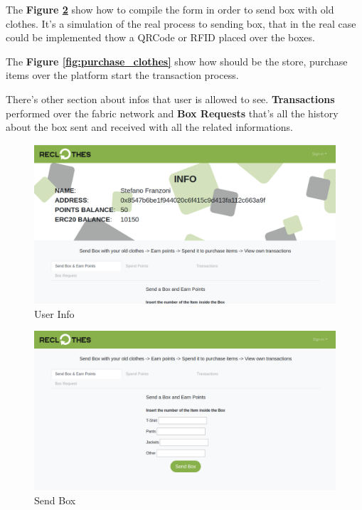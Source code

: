 The \textbf{Figure \ref{fig:send_box}} show how to compile the form in order to send box with old clothes. It's a simulation
of the real process to sending box, that in the real case could be implemented thow a QRCode or RFID
placed over the boxes.

The \textbf{Figure \ref{fig:purchase_clothes}} show how should be the store, purchase items over the platform start the transaction 
process. 

There's other section about infos that user is allowed to see. \textbf{Transactions} performed over
the fabric network and \textbf{Box Requests} that's all the history about the box sent and received
with all the related informations. 

\begin{figure}[h!]
    \centering
    \includegraphics[totalheight=7.5cm]{img/dapp/user-info.png}
    \caption{User Info}
    \label{fig:user_info}
\end{figure}

\begin{figure}[h!]
    \centering
    \includegraphics[totalheight=7.5cm]{img/dapp/user-send.png}
    \caption{Send Box}
    \label{fig:send_box}
\end{figure}


